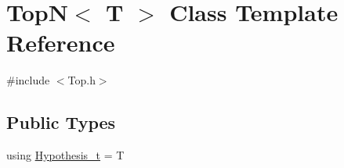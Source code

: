 \hypertarget{class_top_n}{}\section{TopN$<$ T $>$ Class Template Reference}
\label{class_top_n}


{\ttfamily \#include $<$Top.\+h$>$}

\subsection*{Public Types}
\begin{DoxyCompactItemize}
\item 
using \hyperlink{class_top_n_ae734a8791a54516fecbc8cac2c67d16a}{Hypothesis\+\_\+t} = T
\end{DoxyCompactItemize}
